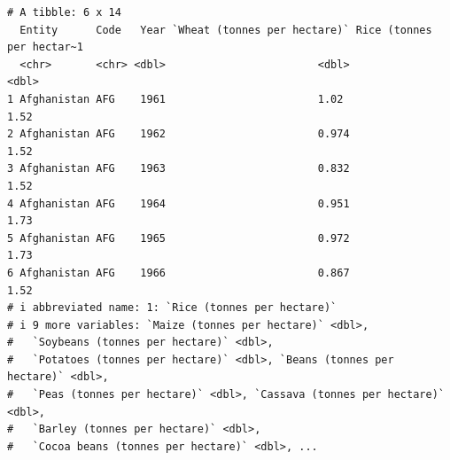 \documentclass[
  letterpaper,
]{book}
\begin{document}
\begin{verbatim}
# A tibble: 6 x 14
  Entity      Code   Year `Wheat (tonnes per hectare)` Rice (tonnes per hectar~1
  <chr>       <chr> <dbl>                        <dbl>                     <dbl>
1 Afghanistan AFG    1961                        1.02                       1.52
2 Afghanistan AFG    1962                        0.974                      1.52
3 Afghanistan AFG    1963                        0.832                      1.52
4 Afghanistan AFG    1964                        0.951                      1.73
5 Afghanistan AFG    1965                        0.972                      1.73
6 Afghanistan AFG    1966                        0.867                      1.52
# i abbreviated name: 1: `Rice (tonnes per hectare)`
# i 9 more variables: `Maize (tonnes per hectare)` <dbl>,
#   `Soybeans (tonnes per hectare)` <dbl>,
#   `Potatoes (tonnes per hectare)` <dbl>, `Beans (tonnes per hectare)` <dbl>,
#   `Peas (tonnes per hectare)` <dbl>, `Cassava (tonnes per hectare)` <dbl>,
#   `Barley (tonnes per hectare)` <dbl>,
#   `Cocoa beans (tonnes per hectare)` <dbl>, ...
\end{verbatim}
\end{document}
